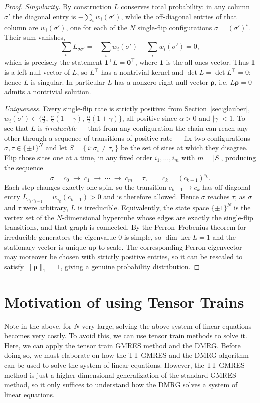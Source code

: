 \documentclass[12pt]{article}
\newcommand{\brho}{\boldsymbol{\rho}}
\theoremstyle{definition}
\theoremstyle{remark}
\begin{document}
\begin{proof}
\emph{Singularity.} By construction $L$ conserves total probability: in any column $\sigma'$ the diagonal entry is $-\sum_i w_i(\sigma')$, while the off-diagonal entries of that column are $w_i(\sigma')$, one for each of the $N$ single-flip configurations $\sigma = (\sigma')^i$. Their sum vanishes,
\[
\sum_{\sigma} L_{\sigma\sigma'}
= -\sum_i w_i(\sigma') + \sum_i w_i(\sigma') = 0,
\]
which is precisely the statement $\mathbf{1}^\top L = \mathbf{0}^\top$, where $\mathbf{1}$ is the all-ones vector. Thus $\mathbf{1}$ is a left null vector of $L$, so $L^\top$ has a nontrivial kernel and $\det L = \det L^\top = 0$; hence $L$ is singular. In particular $L$ has a nonzero right null vector $\brho$, i.e. $L\brho = 0$ admits a nontrivial solution.

\emph{Uniqueness.} Every single-flip rate is strictly positive: from Section~\ref{sec:glauber}, $w_i(\sigma') \in \{\tfrac{\alpha}{2},\, \tfrac{\alpha}{2}(1-\gamma),\, \tfrac{\alpha}{2}(1+\gamma)\}$, all positive since $\alpha > 0$ and $|\gamma| < 1$. To see that $L$ is \emph{irreducible} --- that from any configuration the chain can reach any other through a sequence of transitions of positive rate --- fix two configurations $\sigma, \tau \in \{\pm 1\}^N$ and let $S = \{\, i : \sigma_i \neq \tau_i \,\}$ be the set of sites at which they disagree. Flip those sites one at a time, in any fixed order $i_1, \dots, i_m$ with $m = |S|$, producing the sequence
\[
\sigma = c_0 \;\to\; c_1 \;\to\; \cdots \;\to\; c_m = \tau,
\qquad c_k = (c_{k-1})^{i_k}.
\]
Each step changes exactly one spin, so the transition $c_{k-1} \to c_k$ has off-diagonal entry $L_{c_k\, c_{k-1}} = w_{i_k}(c_{k-1}) > 0$ and is therefore allowed. Hence $\sigma$ reaches $\tau$; as $\sigma$ and $\tau$ were arbitrary, $L$ is irreducible. Equivalently, the state space $\{\pm 1\}^N$ is the vertex set of the $N$-dimensional hypercube whose edges are exactly the single-flip transitions, and that graph is connected. By the Perron--Frobenius theorem for irreducible generators the eigenvalue $0$ is simple, so $\dim\ker L = 1$ and the stationary vector is unique up to scale. The corresponding Perron eigenvector may moreover be chosen with strictly positive entries, so it can be rescaled to satisfy $\|\brho\|_1 = 1$, giving a genuine probability distribution.
\end{proof}
\section{Motivation of using Tensor Trains}\label{sec:tt-motivation}
Note in the above, for $N$ very large, solving the above system of linear equations becomes very costly. To avoid this, we can use tensor train methods to solve it. Here, we can apply the tensor train GMRES method and the DMRG. Before doing so, we must elaborate on how the TT-GMRES and the DMRG algorithm can be used to solve the system of linear equations. However, the TT-GMRES method is just a higher dimensional generalization of the standard GMRES method, so it only suffices to understand how the DMRG solves a system of linear equations.
\end{document}
